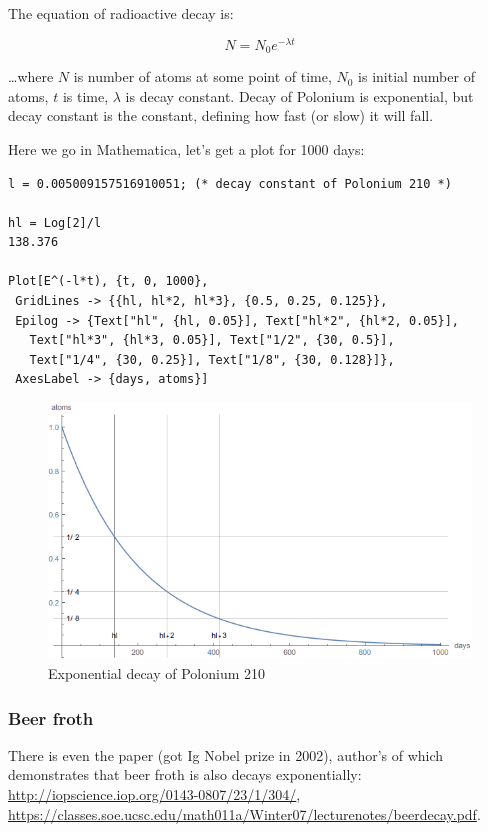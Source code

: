The equation of radioactive decay is:

\[
N=N_{0}e^{-\lambda t}
\]

\dots where $N$ is number of atoms at some point of time, $N_{0}$ is initial number of atoms, $t$ is time, $\lambda$ is decay constant.
Decay of Polonium is exponential, but decay constant is the constant, defining how fast (or slow) it will fall.

Here we go in Mathematica, let's get a plot for 1000 days:

\begin{lstlisting}[caption=Wolfram Mathematica]
l = 0.005009157516910051; (* decay constant of Polonium 210 *)

hl = Log[2]/l
138.376

Plot[E^(-l*t), {t, 0, 1000}, 
 GridLines -> {{hl, hl*2, hl*3}, {0.5, 0.25, 0.125}}, 
 Epilog -> {Text["hl", {hl, 0.05}], Text["hl*2", {hl*2, 0.05}], 
   Text["hl*3", {hl*3, 0.05}], Text["1/2", {30, 0.5}], 
   Text["1/4", {30, 0.25}], Text["1/8", {30, 0.128}]}, 
 AxesLabel -> {days, atoms}]
\end{lstlisting}

\begin{figure}[H]
\centering
\includegraphics[scale=0.66]{log/210po.png}
\caption{Exponential decay of Polonium 210}
\end{figure}

\subsubsection{Beer froth}

There is even the paper (got Ig Nobel prize in 2002), author's of which demonstrates that beer froth is also decays exponentially:
\url{http://iopscience.iop.org/0143-0807/23/1/304/},
\url{https://classes.soe.ucsc.edu/math011a/Winter07/lecturenotes/beerdecay.pdf}.

